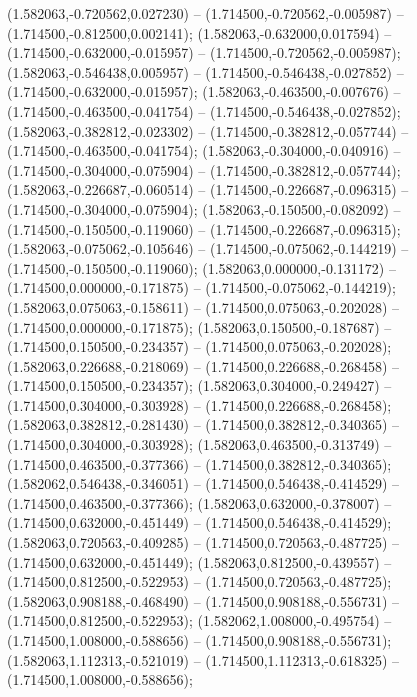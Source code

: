  (1.582063,-0.720562,0.027230) -- (1.714500,-0.720562,-0.005987) -- (1.714500,-0.812500,0.002141);
 (1.582063,-0.632000,0.017594) -- (1.714500,-0.632000,-0.015957) -- (1.714500,-0.720562,-0.005987);
 (1.582063,-0.546438,0.005957) -- (1.714500,-0.546438,-0.027852) -- (1.714500,-0.632000,-0.015957);
 (1.582063,-0.463500,-0.007676) -- (1.714500,-0.463500,-0.041754) -- (1.714500,-0.546438,-0.027852);
 (1.582063,-0.382812,-0.023302) -- (1.714500,-0.382812,-0.057744) -- (1.714500,-0.463500,-0.041754);
 (1.582063,-0.304000,-0.040916) -- (1.714500,-0.304000,-0.075904) -- (1.714500,-0.382812,-0.057744);
 (1.582063,-0.226687,-0.060514) -- (1.714500,-0.226687,-0.096315) -- (1.714500,-0.304000,-0.075904);
 (1.582063,-0.150500,-0.082092) -- (1.714500,-0.150500,-0.119060) -- (1.714500,-0.226687,-0.096315);
 (1.582063,-0.075062,-0.105646) -- (1.714500,-0.075062,-0.144219) -- (1.714500,-0.150500,-0.119060);
 (1.582063,0.000000,-0.131172) -- (1.714500,0.000000,-0.171875) -- (1.714500,-0.075062,-0.144219);
 (1.582063,0.075063,-0.158611) -- (1.714500,0.075063,-0.202028) -- (1.714500,0.000000,-0.171875);
 (1.582063,0.150500,-0.187687) -- (1.714500,0.150500,-0.234357) -- (1.714500,0.075063,-0.202028);
 (1.582063,0.226688,-0.218069) -- (1.714500,0.226688,-0.268458) -- (1.714500,0.150500,-0.234357);
 (1.582063,0.304000,-0.249427) -- (1.714500,0.304000,-0.303928) -- (1.714500,0.226688,-0.268458);
 (1.582063,0.382812,-0.281430) -- (1.714500,0.382812,-0.340365) -- (1.714500,0.304000,-0.303928);
 (1.582063,0.463500,-0.313749) -- (1.714500,0.463500,-0.377366) -- (1.714500,0.382812,-0.340365);
 (1.582062,0.546438,-0.346051) -- (1.714500,0.546438,-0.414529) -- (1.714500,0.463500,-0.377366);
 (1.582063,0.632000,-0.378007) -- (1.714500,0.632000,-0.451449) -- (1.714500,0.546438,-0.414529);
 (1.582063,0.720563,-0.409285) -- (1.714500,0.720563,-0.487725) -- (1.714500,0.632000,-0.451449);
 (1.582063,0.812500,-0.439557) -- (1.714500,0.812500,-0.522953) -- (1.714500,0.720563,-0.487725);
 (1.582063,0.908188,-0.468490) -- (1.714500,0.908188,-0.556731) -- (1.714500,0.812500,-0.522953);
 (1.582062,1.008000,-0.495754) -- (1.714500,1.008000,-0.588656) -- (1.714500,0.908188,-0.556731);
 (1.582063,1.112313,-0.521019) -- (1.714500,1.112313,-0.618325) -- (1.714500,1.008000,-0.588656);
